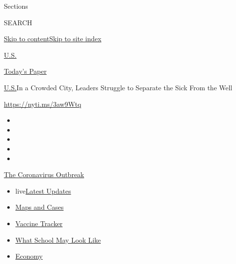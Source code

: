 Sections

SEARCH

\protect\hyperlink{site-content}{Skip to
content}\protect\hyperlink{site-index}{Skip to site index}

\href{https://www.nytimes.com/section/us}{U.S.}

\href{https://myaccount.nytimes.com/auth/login?response_type=cookie\&client_id=vi}{}

\href{https://www.nytimes.com/section/todayspaper}{Today's Paper}

\href{/section/us}{U.S.}\textbar{}In a Crowded City, Leaders Struggle to
Separate the Sick From the Well

\url{https://nyti.ms/3aw9Wtq}

\begin{itemize}
\item
\item
\item
\item
\item
\end{itemize}

\href{https://www.nytimes.com/news-event/coronavirus?action=click\&pgtype=Article\&state=default\&region=TOP_BANNER\&context=storylines_menu}{The
Coronavirus Outbreak}

\begin{itemize}
\tightlist
\item
  live\href{https://www.nytimes.com/2020/08/01/world/coronavirus-covid-19.html?action=click\&pgtype=Article\&state=default\&region=TOP_BANNER\&context=storylines_menu}{Latest
  Updates}
\item
  \href{https://www.nytimes.com/interactive/2020/us/coronavirus-us-cases.html?action=click\&pgtype=Article\&state=default\&region=TOP_BANNER\&context=storylines_menu}{Maps
  and Cases}
\item
  \href{https://www.nytimes.com/interactive/2020/science/coronavirus-vaccine-tracker.html?action=click\&pgtype=Article\&state=default\&region=TOP_BANNER\&context=storylines_menu}{Vaccine
  Tracker}
\item
  \href{https://www.nytimes.com/interactive/2020/07/29/us/schools-reopening-coronavirus.html?action=click\&pgtype=Article\&state=default\&region=TOP_BANNER\&context=storylines_menu}{What
  School May Look Like}
\item
  \href{https://www.nytimes.com/live/2020/07/31/business/stock-market-today-coronavirus?action=click\&pgtype=Article\&state=default\&region=TOP_BANNER\&context=storylines_menu}{Economy}
\end{itemize}

